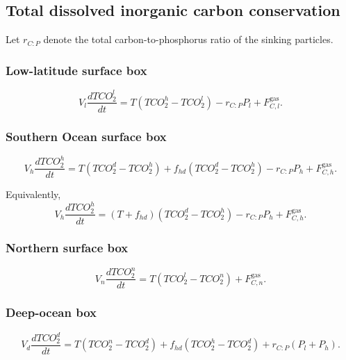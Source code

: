 \documentclass[11pt]{article}
\begin{document}
\subsection{Total dissolved inorganic carbon conservation}

Let \(r_{C:P}\) denote the total carbon-to-phosphorus ratio
of the sinking particles.

\subsubsection{Low-latitude surface box}

\begin{equation}
V_l\frac{dTCO_2^l}{dt}
=
T\left(TCO_2^h-TCO_2^l\right)
-
r_{C:P}P_l
+
F^{\mathrm{gas}}_{C,l}.
\label{eq:four_tco2_l}
\end{equation}

\subsubsection{Southern Ocean surface box}

\begin{equation}
V_h\frac{dTCO_2^h}{dt}
=
T\left(TCO_2^d-TCO_2^h\right)
+
f_{hd}\left(TCO_2^d-TCO_2^h\right)
-
r_{C:P}P_h
+
F^{\mathrm{gas}}_{C,h}.
\label{eq:four_tco2_h}
\end{equation}

Equivalently,
\begin{equation}
V_h\frac{dTCO_2^h}{dt}
=
\left(T+f_{hd}\right)
\left(TCO_2^d-TCO_2^h\right)
-
r_{C:P}P_h
+
F^{\mathrm{gas}}_{C,h}.
\end{equation}

\subsubsection{Northern surface box}

\begin{equation}
V_n\frac{dTCO_2^n}{dt}
=
T\left(TCO_2^l-TCO_2^n\right)
+
F^{\mathrm{gas}}_{C,n}.
\label{eq:four_tco2_n}
\end{equation}

\subsubsection{Deep-ocean box}

\begin{equation}
V_d\frac{dTCO_2^d}{dt}
=
T\left(TCO_2^n-TCO_2^d\right)
+
f_{hd}\left(TCO_2^h-TCO_2^d\right)
+
r_{C:P}\left(P_l+P_h\right).
\label{eq:four_tco2_d}
\end{equation}
\end{document}
